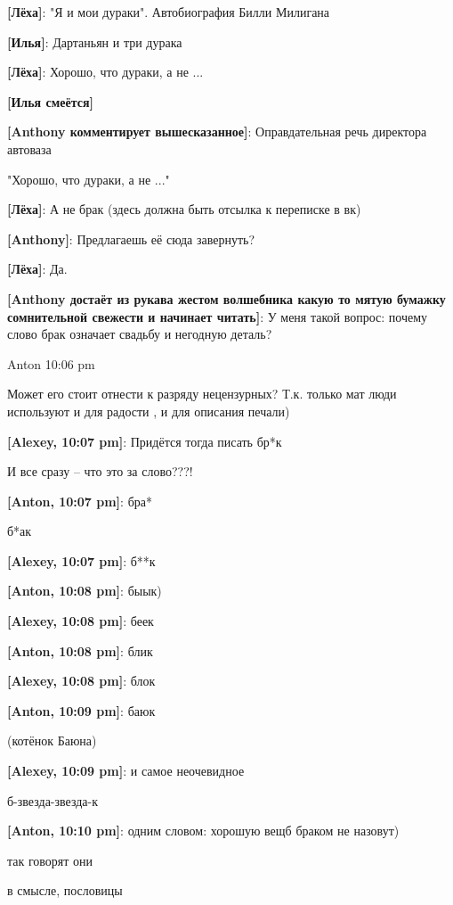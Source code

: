 \begin{flushleft}
\textbf{[Лёха]}: "Я и мои дураки". Автобиография Билли Милигана

\textbf{[Илья]}: Дартаньян и три дурака

\textbf{[Лёха]}: Хорошо, что дураки, а не ...

\textbf{[Илья смеётся]}

\textbf{[Anthony комментирует вышесказанное]}: Оправдательная речь директора автоваза

"Хорошо, что дураки, а не ..."

\textbf{[Лёха]}: А не брак (здесь должна быть отсылка к переписке в вк) %

\textbf{[Anthony]}: Предлагаешь её сюда завернуть?

\textbf{[Лёха]}: Да.

\textbf{[Anthony достаёт из рукава жестом волшебника какую то мятую бумажку сомнительной свежести и начинает читать]}: У меня такой вопрос: почему слово брак означает свадьбу и негодную деталь?

\begingroup
{}\selectfont
Anton 10:06 pm %

Может его стоит отнести к разряду нецензурных? Т.к. только мат люди используют и для радости , и для описания печали)

\textbf{[Alexey, 10:07 pm]}: Придётся тогда писать бр*к

И все сразу -- что это за слово???!

\textbf{[Anton, 10:07 pm]}: бра*

б*ак

\textbf{[Alexey, 10:07 pm]}: б**к

\textbf{[Anton, 10:08 pm]}: быык)

\textbf{[Alexey, 10:08 pm]}: беек

\textbf{[Anton, 10:08 pm]}: блик

\textbf{[Alexey, 10:08 pm]}: блок

\textbf{[Anton, 10:09 pm]}: баюк

(котёнок Баюна)

\textbf{[Alexey, 10:09 pm]}: и самое неочевидное

б-звезда-звезда-к

\textbf{[Anton, 10:10 pm]}: одним словом: хорошую вещб браком не назовут)

так говорят они

в смысле, пословицы


\end{flushleft}
